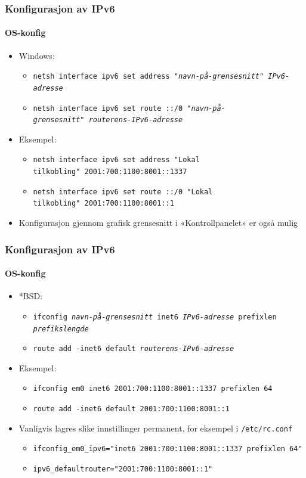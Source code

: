 \begin{frame}%
  \frametitle{Konfigurasjon av IPv6}
  \framesubtitle{OS-konfig}
  \begin{itemize}[<+->]
  \item Windows:
    \begin{itemize}[<+->]
    \item \texttt{netsh interface ipv6 set address\ "\textit{navn-på-grensesnitt}"\ \textit{IPv6-adresse}}
    \item \texttt{netsh interface ipv6 set route ::/0\ "\textit{navn-på-grensesnitt}"\ \textit{routerens-IPv6-adresse}}
    \end{itemize}
  \item Eksempel:
    \begin{itemize}[<+->]
    \item \texttt{netsh interface ipv6 set address\ "\texttt{Lokal tilkobling}"\ 2001:700:1100:8001::1337}
    \item \texttt{netsh interface ipv6 set route ::/0\ "\texttt{Lokal tilkobling}"\ 2001:700:1100:8001::1}
    \end{itemize}
  \item Konfigurasjon gjennom grafisk grensesnitt i «Kontrollpanelet» er også mulig
  \end{itemize}
\end{frame}

\begin{frame}%
  \frametitle{Konfigurasjon av IPv6}
  \framesubtitle{OS-konfig}
  \begin{itemize}[<+->]
  \item *BSD:
    \begin{itemize}[<+->]
    \item \texttt{ifconfig \textit{navn-på-grensesnitt} inet6 \textit{IPv6-adresse} prefixlen \textit{prefikslengde}}
    \item \texttt{route add -inet6 default \textit{routerens-IPv6-adresse}}
    \end{itemize}
  \item Eksempel:
    \begin{itemize}[<+->]
    \item \texttt{ifconfig em0 inet6 2001:700:1100:8001::1337 prefixlen 64}
    \item \texttt{route add -inet6 default 2001:700:1100:8001::1}
    \end{itemize}
  \item Vanligvis lagres slike innstillinger permanent, for eksempel i \texttt{/etc/rc.conf}
    \begin{itemize}[<+->]
    \item \texttt{ifconfig\_em0\_ipv6="inet6 2001:700:1100:8001::1337 prefixlen 64"}
    \item \texttt{ipv6\_defaultrouter="2001:700:1100:8001::1"}
    \end{itemize}
  \end{itemize}
\end{frame}

